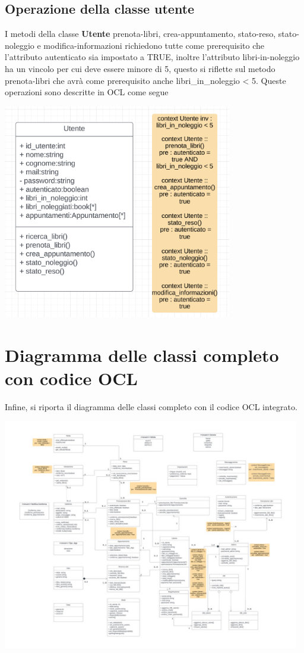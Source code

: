 \documentclass{article}
\begin{document}
\subsection{Operazione della classe utente}

I metodi della classe \textbf{Utente} prenota-libri, crea-appuntamento, stato-reso, stato-noleggio e modifica-informazioni richiedono tutte come prerequisito che l’attributo autenticato sia impostato a TRUE, inoltre l’attributo libri-in-noleggio ha un vincolo per cui deve essere minore di 5, questo si riflette sul metodo prenota-libri che avrà come prerequisito anche libri\_in\_noleggio < 5. Queste operazioni sono descritte in OCL come segue
\begin{center}
        \includegraphics[width=100mm]{D3/Images/utenteOCL.png}
\end{center}

\section{Diagramma delle classi completo con codice OCL}

Infine, si riporta il diagramma delle classi completo con il codice OCL integrato.

\begin{center}
        \includegraphics[width=130mm]{D3/Images/DiagrammaOCL.jpg}
\end{center}
\end{document}
